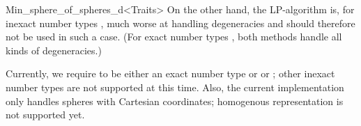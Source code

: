 \begin{ccRefClass}{Min_sphere_of_spheres_d<Traits>}
On the other hand, the LP-algorithm is, for inexact number types
, much worse at handling degeneracies and should therefore not
be used in such a case.  (For exact number types
, both methods handle all kinds of degeneracies.)

Currently, we require  to be either an exact number
type or  or ; other inexact number types are
not supported at this time.  Also, the current implementation only
handles spheres with Cartesian coordinates; homogenous representation
is not supported yet.

\ccExample
{}

\end{ccRefClass}


